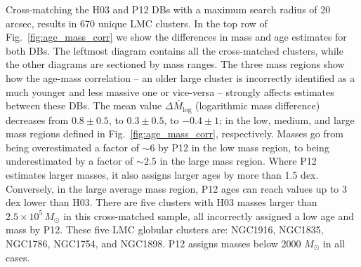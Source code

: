 \documentclass{aa}
\begin{document}
Cross-matching the H03 and P12 DBs with a maximum search radius of 20
arcsec, results in 670 unique LMC clusters.
In the top row of Fig.~\ref{fig:age_mass_corr} we show the differences
in mass and age estimates for both DBs. The leftmost diagram contains all the
cross-matched clusters, while the other diagrams are sectioned by mass
ranges. The three mass regions show how the age-mass correlation -- an older
large cluster is incorrectly identified as a much younger and less massive one
or vice-versa -- strongly affects estimates between these DBs.\@
%
The mean value $\overline{\Delta M_{\log}}$ (logarithmic mass difference)
decreases from $0.8{\pm}0.5$, to $0.3{\pm}0.5$, to $-0.4{\pm}1$; in the
low, medium, and large mass regions defined in
Fig.~\ref{fig:age_mass_corr}, respectively. Masses go from being overestimated a
factor of ${\sim}6$ by P12 in the low mass region, to being underestimated by a
factor of ${\sim}2.5$ in the large mass region.
%
Where P12 estimates larger masses, it also assigns larger ages by more than 1.5
dex. Conversely, in the large average mass region, P12 ages can reach
values up to 3 dex lower than H03.
%
There are five clusters with H03 masses larger than
$2.5{\times}10^5\,M_{\odot}$ in this cross-matched sample, all incorrectly
assigned a low age and mass by P12. These five LMC globular clusters
are: NGC1916, NGC1835, NGC1786, NGC1754, and NGC1898. P12 assigns masses below
2000 $M_{\odot}$ in all cases.
%
\end{document}
